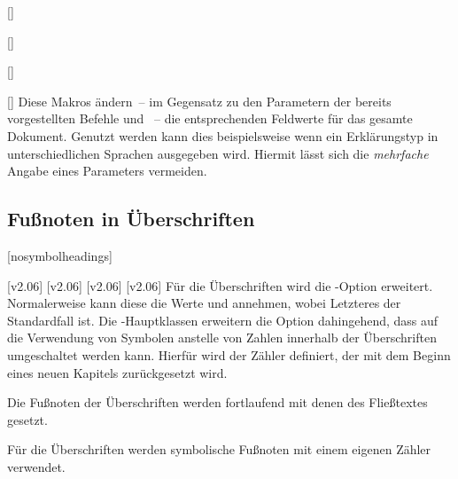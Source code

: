 \begin{Declaration*}{}
\begin{Declaration*}{}
\begin{Declaration*}{}
\begin{Declaration}{[]}
\begin{Declaration}{[]}
\begin{Declaration}{[]}
\begin{Declaration}{[]}
\printdeclarationlist%
%
Diese Makros ändern~-- im Gegensatz zu den Parametern der bereits vorgestellten 
Befehle  und ~-- die entsprechenden 
Feldwerte für das gesamte Dokument. Genutzt werden kann dies beispielsweise 
wenn ein Erklärungstyp in unterschiedlichen Sprachen ausgegeben wird. Hiermit 
lässt sich die \emph{mehrfache} Angabe eines Parameters vermeiden.
%
%
\end{Declaration}
\end{Declaration}
\end{Declaration}
\end{Declaration}


\subsection{Fußnoten in Überschriften}
%
%
%
\begin{Declaration}{}[nosymbolheadings]%
\begin{Declaration}[v2.02]{}%
\printdeclarationlist%
%
[v2.06]
[v2.06]
[v2.06]
[v2.06]
%
Für die Überschriften wird die \KOMAScript-Option  erweitert.
Normalerweise kann diese die Werte  und  
annehmen, wobei Letzteres der Standardfall ist. Die \TUDScript-Hauptklassen 
erweitern die Option dahingehend, dass auf die Verwendung von Symbolen anstelle 
von Zahlen innerhalb der Überschriften umgeschaltet werden kann. Hierfür wird 
der Zähler  definiert, der mit dem Beginn eines neuen 
Kapitels zurückgesetzt wird.
%
\begin{values}{}
\item[nosymbolheadings/numberheadings]
  Die Fußnoten der Überschriften werden fortlaufend mit denen des Fließtextes 
  gesetzt.
\item[symbolheadings]
  Für die Überschriften werden symbolische Fußnoten mit einem eigenen Zähler 
  verwendet.
\end{values}
\end{Declaration}
\end{Declaration}



\end{Declaration*}
\end{Declaration*}
\end{Declaration*}
